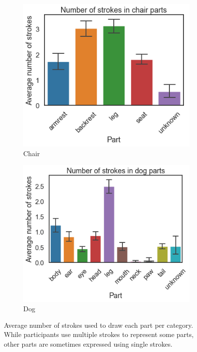 \documentclass[10pt,letterpaper]{article}
\begin{document}
\begin{figure}[htbp]
\hfill
\begin{subfigure}[t]{0.2\textwidth}
\centering
\includegraphics[width=1.2\textwidth]{figures/chair_average_parts.png}
\caption{Chair}
\end{subfigure}
 \hfill
\begin{subfigure}[t]{0.2\textwidth}
\centering
\includegraphics[width=1.2\textwidth]{figures/dog_average_parts.png}
\caption{Dog}
\end{subfigure}
\caption{Average number of strokes used to draw each part per category. While participants use multiple strokes to represent some parts, other parts are sometimes expressed using single strokes.}
\label{strokesperpart}
\end{figure}
\end{document}
